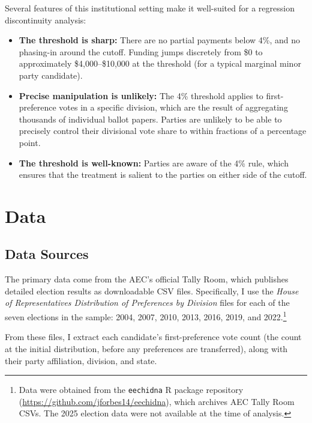 \documentclass[12pt, a4paper]{article}
\begin{document}
Several features of this institutional setting make it well-suited for a regression discontinuity analysis:

\begin{itemize}
    \item \textbf{The threshold is sharp:} There are no partial payments below 4\%, and no phasing-in around the cutoff. Funding jumps discretely from \$0 to approximately \$4,000--\$10,000 at the threshold (for a typical marginal minor party candidate).

    \item \textbf{Precise manipulation is unlikely:} The 4\% threshold applies to first-preference votes in a specific division, which are the result of aggregating thousands of individual ballot papers. Parties are unlikely to be able to precisely control their divisional vote share to within fractions of a percentage point.

    \item \textbf{The threshold is well-known:} Parties are aware of the 4\% rule, which ensures that the treatment is salient to the parties on either side of the cutoff.
\end{itemize}

\section{Data}
\label{sec:data}

\subsection{Data Sources}

The primary data come from the AEC's official Tally Room, which publishes detailed election results as downloadable CSV files. Specifically, I use the \emph{House of Representatives Distribution of Preferences by Division} files for each of the seven elections in the sample: 2004, 2007, 2010, 2013, 2016, 2019, and 2022.\footnote{Data were obtained from the \texttt{eechidna} R package repository (\url{https://github.com/jforbes14/eechidna}), which archives AEC Tally Room CSVs. The 2025 election data were not available at the time of analysis.}

From these files, I extract each candidate's first-preference vote count (the count at the initial distribution, before any preferences are transferred), along with their party affiliation, division, and state.
\end{document}
